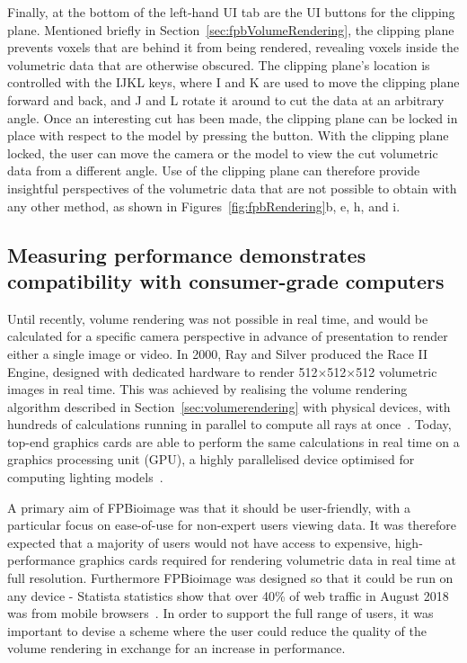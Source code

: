 Finally, at the bottom of the left-hand UI tab are the UI buttons for the clipping plane.
Mentioned briefly in Section~\ref{sec:fpbVolumeRendering}, the clipping plane prevents voxels that are behind it from being rendered, revealing voxels inside the volumetric data that are otherwise obscured.
The clipping plane's location is controlled with the IJKL keys, where I and K are used to move the clipping plane forward and back, and J and L rotate it around to cut the data at an arbitrary angle.
Once an interesting cut has been made, the clipping plane can be locked in place with respect to the model by pressing the  button.
With the clipping plane locked, the user can move the camera or the model to view the cut volumetric data from a different angle.
Use of the clipping plane can therefore provide insightful perspectives of the volumetric data that are not possible to obtain with any other method, as shown in Figures~\ref{fig:fpbRendering}b, e, h, and i.

\subsection{Measuring performance demonstrates compatibility with consumer-grade computers} \label{sec:fpbPerformance}
Until recently, volume rendering was not possible in real time, and would be calculated for a specific camera perspective in advance of presentation to render either a single image or video.
In 2000, Ray and Silver produced the Race II Engine, designed with dedicated hardware to render 512$\times$512$\times$512 volumetric images in real time.
This was achieved by realising the volume rendering algorithm described in Section~\ref{sec:volumerendering} with physical devices, with hundreds of calculations running in parallel to compute all rays at once~\cite{ray2000race}.
Today, top-end graphics cards are able to perform the same calculations in real time on a graphics processing unit (GPU), a highly parallelised device optimised for computing lighting models~\cite{lindholm2008nvidia}.

A primary aim of FPBioimage was that it should be user-friendly, with a particular focus on ease-of-use for non-expert users viewing data.
It was therefore expected that a majority of users would not have access to expensive, high-performance graphics cards required for rendering volumetric data in real time at full resolution.
Furthermore FPBioimage was designed so that it could be run on any device - Statista statistics show that over 40\% of web traffic in August 2018 was from mobile browsers~\cite{statistica2018mobile}.
In order to support the full range of users, it was important to devise a scheme where the user could reduce the quality of the volume rendering in exchange for an increase in performance.

